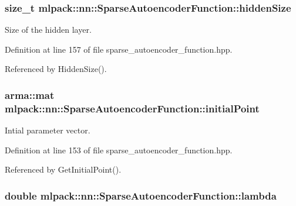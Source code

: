 \subsubsection[{hidden\-Size}]{\setlength{\rightskip}{0pt plus 5cm}size\-\_\-t mlpack\-::nn\-::\-Sparse\-Autoencoder\-Function\-::hidden\-Size\hspace{0.3cm}{\ttfamily [private]}}\label{classmlpack_1_1nn_1_1SparseAutoencoderFunction_a9e486091967e75767f3e4c31aab838f6}


Size of the hidden layer. 



Definition at line 157 of file sparse\-\_\-autoencoder\-\_\-function.\-hpp.



Referenced by Hidden\-Size().

\subsubsection[{initial\-Point}]{\setlength{\rightskip}{0pt plus 5cm}arma\-::mat mlpack\-::nn\-::\-Sparse\-Autoencoder\-Function\-::initial\-Point\hspace{0.3cm}{\ttfamily [private]}}\label{classmlpack_1_1nn_1_1SparseAutoencoderFunction_a915ad80131a89c5dacc0829b5fb050c2}


Intial parameter vector. 



Definition at line 153 of file sparse\-\_\-autoencoder\-\_\-function.\-hpp.



Referenced by Get\-Initial\-Point().

\subsubsection[{lambda}]{\setlength{\rightskip}{0pt plus 5cm}double mlpack\-::nn\-::\-Sparse\-Autoencoder\-Function\-::lambda\hspace{0.3cm}{\ttfamily [private]}}\label{classmlpack_1_1nn_1_1SparseAutoencoderFunction_a265662d7e4cc5b9b11d01f96ffa34dfb}


